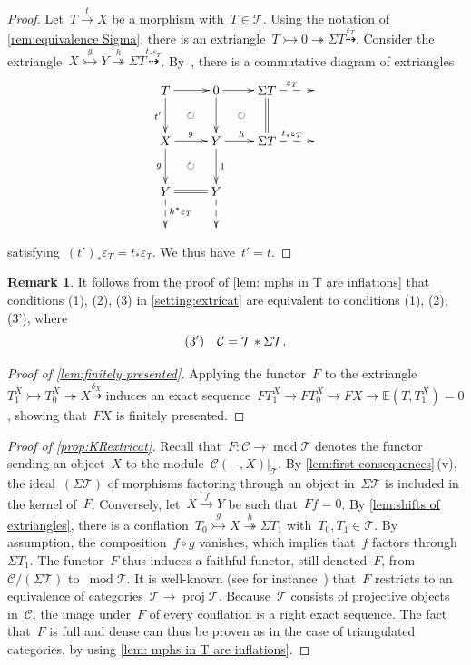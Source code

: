 \documentclass{amsart}
\theoremstyle{definition}
\newtheorem{remark}[theorem]{Remark}
\newcommand{\cat}{\mathcal{C}}
\newcommand{\susp}{\Sigma}
\newcommand{\MOD}{\operatorname{mod}}
\newcommand{\proj}{\operatorname{proj}}
\newcommand{\tc}{\mathcal{T}}
\newcommand{\infl}{\rightarrowtail}
\newcommand{\defl}{\twoheadrightarrow}
\newcommand{\modt}{\MOD\tc}
\newcommand{\eps}{\varepsilon}
\begin{document}
\begin{proof}
Let~$T \overset{t}{\to} X$ be a morphism with~$T \in \tc$.
Using the notation of \cref{rem:equivalence Sigma}, there is an extriangle~$T\infl 0\defl \susp T \overset{\eps_T}{\dashrightarrow}$.
Consider the extriangle~$X\overset{g}{\infl} Y \overset{h}{\defl} \susp T \overset{t_\ast\eps_T}{\dashrightarrow}$.
By~\cite[Prop.~3.17]{NakaokaPalu}, there is a commutative diagram of extriangles
\[
\xy
(-7,7)*+{T}="2";
(7,7)*+{0}="4";
(21,7)*+{\susp T}="6";
(35,7)*+{}="8";
%
(-7,-7)*+{X}="12";
(7,-7)*+{Y}="14";
(21,-7)*+{\susp T}="16";
(35,-7)*+{}="18";
%
(-7,-21)*+{Y}="22";
(7,-21)*+{Y}="24";
%
(-7,-32)*+{}="32";
(7,-32)*+{}="34";
%
{\ar@{->} "2";"4"};
{\ar@{->} "4";"6"};
{\ar@{-->}^{\eps_T} "6";"8"};
%
{\ar@{->}_{t'} "2";"12"};
{\ar "4";"14"};
{\ar@{=} "6";"16"};
%
{\ar^{g} "12";"14"};
{\ar^{h} "14";"16"};
{\ar@{-->}^{t_\ast\eps_T} "16";"18"};
%
{\ar_{g} "12";"22"};
{\ar^{1} "14";"24"};
%
{\ar@{=} "22";"24"};
%
{\ar@{-->}^{h^\ast\eps_T} "22";"32"};
{\ar@{-->} "24";"34"};
%
{\ar@{}|\circlearrowright "2";"14"};
{\ar@{}|\circlearrowright "4";"16"};
{\ar@{}|\circlearrowright "12";"24"};
\endxy
\]
satisfying~$(t')_\ast\eps_T=t_\ast\eps_T$.
We thus have~$t'=t$.
\end{proof}

\begin{remark}
It follows from the proof of \cref{lem: mphs in T are inflations} that conditions (1), (2), (3) in \cref{setting:extricat} are equivalent to conditions (1), (2), (3'), where
\[
{\rm (3')} \quad \cat = \tc\ast\susp\tc.
\]
\end{remark}

\begin{proof}[Proof of \cref{lem:finitely presented}]
Applying the functor~$F$ to the extriangle~$T_1^X\infl T_0^X\defl X\overset{\delta_X}{\dashrightarrow}$ induces an exact sequence~$FT_1^X \to FT_0^X \to FX \to \mathbb{E}(T,T_1^X)=0$, showing that~$FX$ is finitely presented.
\end{proof}

\begin{proof}[Proof of \cref{prop:KRextricat}]
Recall that~$F:\cat\to\modt$ denotes the functor sending an object~$X$ to the module~$\cat(-,X)|_\tc$.
By \cref{lem:first consequences}\,(v), the ideal~$(\susp\tc)$ of morphisms factoring through an object in~$\susp\tc$ is included in the kernel of~$F$.
Conversely, let~$X\xrightarrow{f}Y$ be such that~$Ff=0$.
By \cref{lem:shifts of extriangles}, there is a conflation~$T_0\overset{g}{\infl} X\overset{h}{\defl} \susp T_1$ with~$T_0,T_1\in\tc$.
By assumption, the composition~$f\circ g$ vanishes, which implies that~$f$ factors through~$\susp T_1$.
The functor~$F$ thus induces a faithful functor, still denoted~$F$, from~$\cat/(\susp\tc)$ to~$\modt$.
It is well-known (see for instance~\cite[Lem.~3.1]{AssemSimsonSkowronski}) that~$F$ restricts to an equivalence of categories~$\tc\to\proj\tc$.
Because~$\tc$ consists of projective objects in~$\cat$, the image under~$F$ of every conflation is a right exact sequence.
The fact that~$F$ is full and dense can thus be proven as in the case of triangulated categories, by using \cref{lem: mphs in T are inflations}.
\end{proof}
\end{document}
